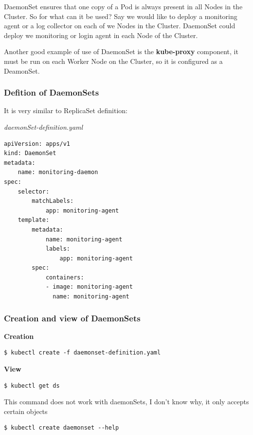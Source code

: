 \documentclass{article}
\newenvironment{blocktemplateIII}[1]{%
    \tcolorbox[beamer,%
    noparskip,breakable,
    ,colframe=Red,%
    colbacklower=LimeGreen!75!LightGreen,%
    title=#1]}%
    {\endtcolorbox}
\newenvironment{codetemplate}[1][]{%
  \mybasecolorbox[#1]
  \itshape
}{%
  \endmybasecolorbox
}
\begin{document}
DaemonSet ensures that one copy of a Pod is always present in all Nodes in the Cluster. So for what can it be used? Say we would like to deploy a monitoring agent or a log collector on each of we Nodes in the Cluster. DaemonSet could deploy we monitoring or login agent in each Node of the Cluster.

Another good example of use of DaemonSet is the \textbf{kube-proxy} component, it must be run on each Worker Node on the Cluster, so it is configured as a DeamonSet.

\subsubsection{Defition of DaemonSets}

It is very similar to ReplicaSet definition:

\begin{codetemplate}{daemonSet-definition.yaml}
\begin{verbatim}
apiVersion: apps/v1
kind: DaemonSet
metadata:
    name: monitoring-daemon
spec:
    selector:
        matchLabels:
            app: monitoring-agent
    template:
        metadata:
            name: monitoring-agent
            labels:
                app: monitoring-agent
        spec:
            containers:
            - image: monitoring-agent
              name: monitoring-agent
\end{verbatim}
\end{codetemplate}

\subsubsection{Creation and view of DaemonSets}

\textbf{Creation}
\begin{codetemplate}{}
\begin{verbatim}
$ kubectl create -f daemonset-definition.yaml
\end{verbatim}
\end{codetemplate}

\textbf{View}
\begin{codetemplate}{}
\begin{verbatim}
$ kubectl get ds
\end{verbatim}
\end{codetemplate}

\begin{blocktemplateIII}{WARNING}
This command does not work with daemonSets, I don't know why, it only accepts certain objects
\begin{codetemplate}{}
\begin{verbatim}
$ kubectl create daemonset --help
\end{verbatim}
\end{codetemplate}
\end{blocktemplateIII}
\end{document}
